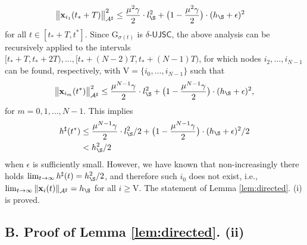 \documentclass[a4paper, 11pt]{article}
\begin{document}
 \begin{align}\label{15}
\big \|\mathbf{x}_{i_1}(t_\ast+T)\big\|_{\mathcal{A}^\sharp}^2
&\leq  \frac{\mu^2 \gamma}{2} \cdot l_\S^2+\big(1-\frac{\mu^2\gamma}{2}\big) \cdot(h_\S +\epsilon)^2
\end{align}
for all $t\in[t_\ast+T,t^\ast]$.
Since  $\mathrm{G}_{\sigma(t)}$ is $\delta$-$\mathsf{UJSC}$, the above analysis can be recursively applied to the intervals $[t_\ast+T,t_\ast+2T),\dots,[t_\ast+(N-2)T,t_\ast+(N-1)T)$, for which nodes $i_2,\dots,i_{N-1}$ can be found, respectively, with $\mathrm{V}=\{i_0,\dots,i_{N-1}\}$ such that
 \begin{align}
\big \|\mathbf{x}_{i_m}(t^\ast)\big\|_{\mathcal{A}^\sharp}^2
\leq  \frac{\mu^{N-1} \gamma}{2} \cdot l_\S^2+\big(1-\frac{\mu^{N-1}\gamma}{2}\big) \cdot(h_\S +\epsilon)^2,
\end{align}
for $m=0,1,\dots,N-1.$
This implies
 \begin{align}\label{13}
h^\sharp(t^\ast)
&\leq  \frac{\mu^{N-1} \gamma}{2} \cdot l_\S^2/2+\big(1-\frac{\mu^{N-1}\gamma}{2}\big) \cdot(h_\S +\epsilon)^2 /2\nonumber\\
&<h_\S^2/2
\end{align}
when $\epsilon$ is sufficiently small. However, we have known that non-increasingly there holds $
\lim_{t\to \infty}h^\sharp(t)=h_\S^2/2$, and therefore such $i_0$ does not exist, i.e.,  $\lim_{t\to\infty}\|\mathbf{x}_i(t)\|_{\mathcal{A}^\sharp}=h_\S$ for all $i\geq \mathrm{V}$. The statement of Lemma \ref{lem:directed}. (i) is proved.

\subsection*{B. Proof of Lemma \ref{lem:directed}. (ii)}
\end{document}
